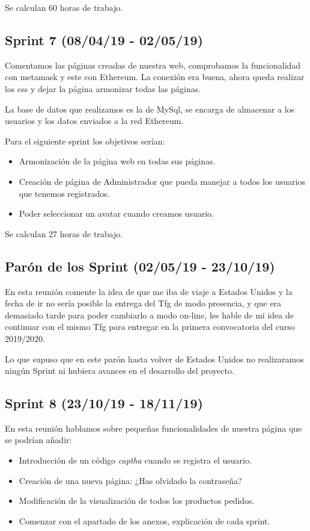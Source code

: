 Se calculan 60 horas de trabajo.
	
\subsection{Sprint 7 (08/04/19 - 02/05/19)}

Comentamos las páginas creadas de nuestra web, comprobamos la funcionalidad con metamask y este con Ethereum. La conexión era buena, ahora queda realizar los css y dejar la página armonizar todas las páginas. 

La base de datos que realizamos es la de MySql, se encarga de almacenar a los usuarios y los datos enviados a la red Ethereum.

Para el siguiente sprint los objetivos serían:

\begin{itemize}
	\item Armonización de la página web en todas sus páginas.
	\item Creación de página de Administrador que pueda manejar a todos los usuarios que tenemos registrados.
	\item Poder seleccionar un avatar cuando creamos usuario.
\end{itemize}

Se calculan 27 horas de trabajo.


\subsection{Parón de los Sprint (02/05/19 - 23/10/19)}

En esta reunión comente la idea de que me iba de viaje a Estados Unidos y la fecha de ir no sería posible la entrega del Tfg de modo presencia, y que era demasiado tarde para poder cambiarlo a modo on-line, les hable de mi idea de continuar con el mismo Tfg para entregar en la primera convocatoria del curso 2019/2020.

Lo que supuso que en este parón hasta volver de Estados Unidos no realizaramos ningún Sprint ni hubiera avances en el desarrollo del proyecto.


\subsection{Sprint 8 (23/10/19 - 18/11/19)}

En esta reunión hablamos sobre pequeñas funcionalidades de nuestra página que se podrían añadir:

\begin{itemize}
	\item Introducción de un código \textit{captha} cuando se registra el usuario.
	\item Creación de una nueva página: ¿Has olvidado la contraseña?
	\item Modificación de la visualización de todos los productos pedidos.
	\item Comenzar con el apartado de los anexos, explicación de cada sprint.
\end{itemize}

